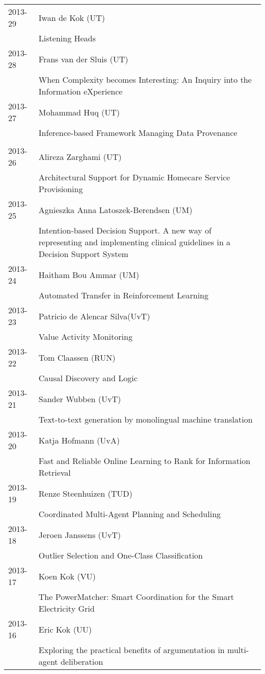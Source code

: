 \begin{longtable}{p{1.25cm}p{10.75cm}}
2013-29 & Iwan de Kok (UT) \\& Listening Heads \\
2013-28 & Frans van der Sluis (UT) \\& When Complexity becomes Interesting: An Inquiry into the Information eXperience \\
2013-27 & Mohammad Huq (UT) \\& Inference-based Framework Managing Data Provenance \\
\\
2013-26 & Alireza Zarghami (UT) \\& Architectural Support for Dynamic Homecare Service Provisioning \\
2013-25 & Agnieszka Anna Latoszek-Berendsen (UM) \\& Intention-based Decision Support. A new way of representing and \newline implementing clinical guidelines in a Decision Support System \\
2013-24 & Haitham Bou Ammar (UM) \\& Automated Transfer in Reinforcement Learning \\
2013-23 & Patricio de Alencar Silva(UvT) \\& Value Activity Monitoring \\
2013-22 & Tom Claassen (RUN) \\& Causal Discovery and Logic \\
2013-21 & Sander Wubben (UvT) \\& Text-to-text generation by monolingual machine translation \\
2013-20 & Katja Hofmann (UvA) \\& Fast and Reliable Online Learning to Rank for Information Retrieval \\
2013-19 & Renze Steenhuizen (TUD) \\& Coordinated Multi-Agent Planning and Scheduling \\
2013-18 & Jeroen Janssens (UvT) \\& Outlier Selection and One-Class Classification \\
2013-17 & Koen Kok (VU) \\& The PowerMatcher: Smart Coordination for the Smart Electricity Grid \\
2013-16 & Eric Kok (UU) \\& Exploring the practical benefits of argumentation in multi-agent \newline deliberation \\

\end{longtable}
